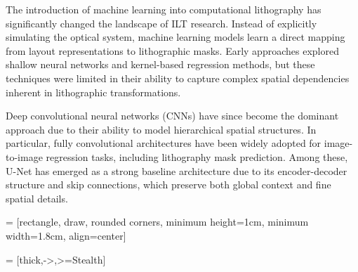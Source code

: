 \documentclass[conference]{IEEEtran}
\begin{document}
The introduction of machine learning into computational lithography has significantly changed the landscape of ILT research. Instead of explicitly simulating the optical system, machine learning models learn a direct mapping from layout representations to lithographic masks. Early approaches explored shallow neural networks and kernel-based regression methods, but these techniques were limited in their ability to capture complex spatial dependencies inherent in lithographic transformations.

Deep convolutional neural networks (CNNs) have since become the dominant approach due to their ability to model hierarchical spatial structures. In particular, fully convolutional architectures have been widely adopted for image-to-image regression tasks, including lithography mask prediction. Among these, U-Net has emerged as a strong baseline architecture due to its encoder-decoder structure and skip connections, which preserve both global context and fine spatial details.



 = [rectangle, draw, rounded corners,
minimum height=1cm, minimum width=1.8cm, align=center]

 = [thick,->,>=Stealth]
\end{document}
